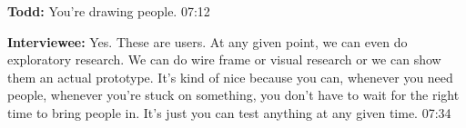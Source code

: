 \textbf{Todd:} You're drawing people. 07:12

\textbf{Interviewee:} Yes. These are users. At any given point, we can even do exploratory research. We can do wire frame or visual research or we can show them an actual prototype. 	It's kind of nice because you can, whenever you need people, whenever you're stuck on something, you don't have to wait for the right time to bring people in. 	It's just you can test anything at any given time.  07:34
